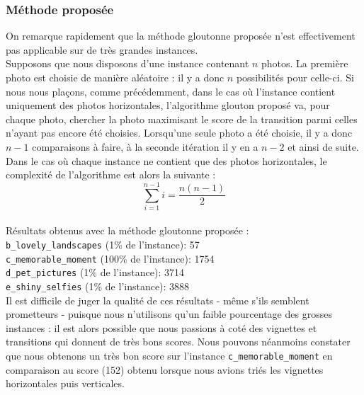 \documentclass[12pt,a4paper]{article}
\begin{document}
\vspace{1\baselineskip}

\subsubsection{Méthode proposée}

\vspace{1\baselineskip}

\noindent On remarque rapidement que la méthode gloutonne proposée n'est effectivement pas applicable sur de très grandes instances.\\
Supposons que nous disposons d'une instance contenant $n$ photos. La première photo est choisie de manière aléatoire : il y a donc $n$ possibilités pour celle-ci. Si nous nous plaçons, comme précédemment, dans le cas où l'instance contient uniquement des photos horizontales, l'algorithme glouton proposé va, pour chaque photo, chercher la photo maximisant le score de la transition parmi celles n'ayant pas encore été choisies. Lorsqu'une seule photo a été choisie, il y a donc $n-1$ comparaisons à faire, à la seconde itération il y en a $n-2$ et ainsi de suite. Dans le cas où chaque instance ne contient que des photos horizontales, le complexité de l'algorithme est alors la suivante :
\[\sum_{i=1}^{n-1} i = \frac{n(n-1)}{2}\]\\
Résultats obtenus avec la méthode gloutonne proposée :
\vspace{.5\baselineskip}\\
\verb|b_lovely_landscapes| (1\% de l'instance): 57  \\
\verb|c_memorable_moment| (100\% de l'instance): 1754 \\ 
\verb|d_pet_pictures| (1\% de l'instance): 3714  \\
\verb|e_shiny_selfies| (1\% de l'instance): 3888 
\vspace{1\baselineskip}\\
Il est difficile de juger la qualité de ces résultats - même s'ils semblent prometteurs - puisque nous n'utilisons qu'un faible pourcentage des grosses instances : il est alors possible que nous passions à coté des vignettes et transitions qui donnent de très bons scores. Nous pouvons néanmoins constater que nous obtenons un très bon score sur l'instance \verb|c_memorable_moment| en comparaison au score (152) obtenu lorsque nous avions triés les vignettes horizontales puis verticales.
\end{document}
